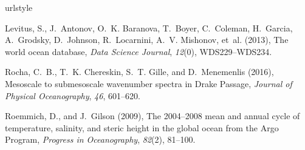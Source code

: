 \documentclass[draft,grl]{agutexSI}
\begin{document}
\begin{article}
%
%
%
%
%
%
%
%
%

%

\begin{thebibliography}{3}
\providecommand{\natexlab}[1]{#1}
\expandafter\ifx\csname urlstyle\endcsname\relax
  \providecommand{\doi}[1]{doi:\discretionary{}{}{}#1}\else
  \providecommand{\doi}{doi:\discretionary{}{}{}\begingroup
  \urlstyle{rm}\Url}\fi

  Levitus, S., J.~Antonov, O.~K. Baranova, T.~Boyer, C.~Coleman, H.~Garcia,
    A.~Grodsky, D.~Johnson, R.~Locarnini, A.~V. Mishonov, et~al. (2013), The
    world ocean database, \textit{Data Science Journal}, \textit{12}(0),
    WDS229--WDS234.

Rocha, C.~B., T.~K. Chereskin, S.~T. Gille, and D.~Menemenlis (2016),
  {Mesoscale to submesoscale wavenumber spectra in Drake Passage},
  \textit{Journal of Physical Oceanography}, \textit{46}, 601--620.

  Roemmich, D., and J.~Gilson (2009), {The 2004--2008 mean and annual cycle of
    temperature, salinity, and steric height in the global ocean from the Argo
    Program}, \textit{Progress in Oceanography}, \textit{82}(2), 81--100.


\end{thebibliography}
\end{article}
\end{document}
